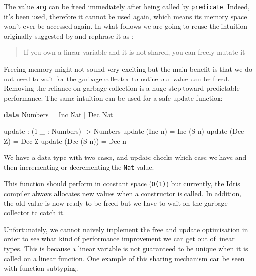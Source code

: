 \documentclass[
]{article}
\newenvironment{Shaded}{}{}
\newcommand{\DataTypeTok}[1]{\textcolor[rgb]{0.56,0.13,0.00}{#1}}
\newcommand{\DecValTok}[1]{\textcolor[rgb]{0.25,0.63,0.44}{#1}}
\newcommand{\KeywordTok}[1]{\textcolor[rgb]{0.00,0.44,0.13}{\textbf{#1}}}
\newcommand{\NormalTok}[1]{#1}
\newcommand{\OperatorTok}[1]{\textcolor[rgb]{0.40,0.40,0.40}{#1}}
\newcommand{\OtherTok}[1]{\textcolor[rgb]{0.00,0.44,0.13}{#1}}
\begin{document}
The value \texttt{arg} can be freed immediately after being called by
\texttt{predicate}. Indeed, it's been used, therefore it cannot be used
again, which means its memory space won't ever be accessed again. In
what follows we are going to reuse the intuition originally suggested by
\cite{once_upon_a_type}\cite{linear_types_update}\cite{linear_use} and
rephrase it as :

\begin{quote}
If you own a linear variable and it is not shared, you can freely mutate
it
\end{quote}

Freeing memory might not sound very exciting but the main benefit is
that we do not need to wait for the garbage collector to notice our
value can be freed. Removing the reliance on garbage collection is a
huge step toward predictable performance. The same intuition can be used
for a safe-update function:

\begin{Shaded}
\begin{Highlighting}[]
\KeywordTok{data} \DataTypeTok{Numbers} \OtherTok{=} \DataTypeTok{Inc} \DataTypeTok{Nat} \OperatorTok{|} \DataTypeTok{Dec} \DataTypeTok{Nat}

\NormalTok{update }\OperatorTok{:}\NormalTok{ (}\DecValTok{1}\NormalTok{ \_ }\OperatorTok{:} \DataTypeTok{Numbers}\NormalTok{) }\OtherTok{{-}\textgreater{}} \DataTypeTok{Numbers}
\NormalTok{update (}\DataTypeTok{Inc}\NormalTok{ n) }\OtherTok{=} \DataTypeTok{Inc}\NormalTok{ (}\DataTypeTok{S}\NormalTok{ n)}
\NormalTok{update (}\DataTypeTok{Dec} \DataTypeTok{Z}\NormalTok{) }\OtherTok{=} \DataTypeTok{Dec} \DataTypeTok{Z}
\NormalTok{update (}\DataTypeTok{Dec}\NormalTok{ (}\DataTypeTok{S}\NormalTok{ n)) }\OtherTok{=} \DataTypeTok{Dec}\NormalTok{ n}
\end{Highlighting}
\end{Shaded}

We have a data type with two cases, and update checks which case we have
and then incrementing or decrementing the \texttt{Nat} value.

This function should perform in constant space (\texttt{O(1)}) but
currently, the Idris compiler always allocates new values when a
constructor is called. In addition, the old value is now ready to be
freed but we have to wait on the garbage collector to catch it.

Unfortunately, we cannot naively implement the free and update
optimisation in order to see what kind of performance improvement we can
get out of linear types. This is because a linear variable is not
guaranteed to be unique when it is called on a linear function. One
example of this sharing mechanism can be seen with function subtyping.
\end{document}
